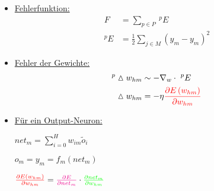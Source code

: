 \documentclass[12pt, a4paper]{article}
\begin{document}
\begin{itemize}

\item[]
\underline{Fehlerfunktion:}
\begin{align*}
F &= \sum_{p \in P} \ ^pE \\
^p E &= \frac{1}{2} \sum_{j \in M} \left(\hat{y}_m - y_m \right)^2
\end{align*}

\item[]
\underline{Fehler der Gewichte:}
\begin{align*}
^p \vartriangle w_{hm} &\sim - \nabla_w \cdot \ ^p E \\
\vartriangle w_{hm} &= - \eta \textcolor{red}{\frac{\partial E \left( w_{hm} \right) }{ \partial w_{hm}} }
\end{align*}

\item[]
\underline{Für ein Output-Neuron:}

$net_m = \sum_{i=0}^H w_{im} \tilde{o}_i$

$o_m = y_m = f_m(net_m) $

$ \textcolor{red}{\frac{\partial E \left( w_{hm} \right) }{ \partial w_{hm} }} = \textcolor{magenta}{\frac{\partial E }{ \partial net_m }} \cdot \textcolor{green}{\frac{ \partial net_m }{ \partial w_{hm} }}$


\end{itemize}
\end{document}
